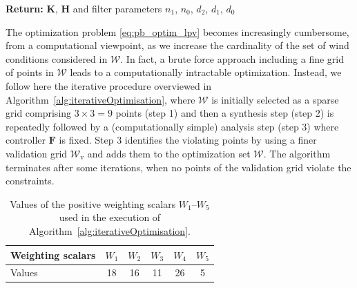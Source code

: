 \begin{algorithm}
\begin{algorithmic}[1]
    \State \label{step:final} 
    \textbf{Return:} $\boldsymbol{K}$, $\boldsymbol{H}$ and filter parameters $n_1$, $n_0$,  $d_2$,  $d_1$,  $d_0$
    
  \end{algorithmic}
\end{algorithm}

The optimization problem \eqref{eq:pb_optim_lpv} becomes increasingly cumbersome, from a computational viewpoint, as we increase the cardinality of the set of wind conditions considered in ${\mathcal W}$. In fact, a brute force approach including a fine grid of points in ${\mathcal W}$ leads to a computationally intractable optimization. Instead, we follow here the
iterative procedure overviewed in Algorithm~\ref{alg:iterativeOptimisation}, 
where ${\mathcal W}$ is initially selected as a sparse grid comprising $3 \times 3 = 9$ points (step 1) and then 
a synthesis step (step 2) is repeatedly followed by a (computationally simple) analysis step (step 3) where controller $\boldsymbol{F}$ is fixed.
Step 3 identifies the violating points by using a finer validation grid ${\mathcal W}_{\text{v}}$ and adds them to 
the optimization set ${\mathcal W}$. The algorithm terminates after some iterations, when no points of the validation grid violate the constraints.

\begin{table}
\centering
\begin{tabular}{|l|c|c|c|c|c|} 
\hline
 Weighting scalars & $W_1$ & $W_2$ & $W_3$ & $W_4$ & $W_5$ \\ \hline
Values &18 & 16 & 11 & 26 & 5 \\ \hline
\end{tabular}
\label{tab:W1-W5}
\caption{Values of the positive weighting scalars $W_1$--$W_5$ used in the execution of Algorithm~\ref{alg:iterativeOptimisation}.}
\end{table}

